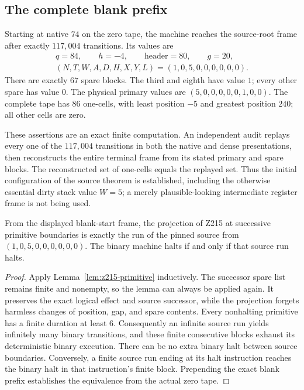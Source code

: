 \subsection{The complete blank prefix}

Starting at native $74$ on the zero tape, the machine reaches the source-root
frame after exactly $117{,}004$ transitions.  Its values are
\[
 \begin{gathered}
 q=84,\qquad h=-4,\qquad \text{header}=80,\qquad g=20,\\
 (N,T,W,A,D,H,X,Y,L)=(1,0,5,0,0,0,0,0,0).
 \end{gathered}
\]
There are exactly $67$ spare blocks.  The third and eighth have value $1$;
every other spare has value $0$.  The physical primary values are
$(5,0,0,0,0,0,1,0,0)$.  The complete tape has $86$ one-cells, with least
position $-5$ and greatest position $240$; all other cells are zero.

These assertions are an exact finite computation.  An independent audit
replays every one of the $117{,}004$ transitions in both the native and dense
presentations, then reconstructs the entire terminal frame from its stated
primary and spare blocks.  The reconstructed set of one-cells equals the
replayed set.  Thus the initial configuration of the source theorem is
established, including the otherwise essential dirty stack value $W=5$;
a merely plausible-looking intermediate register frame is not being used.

\begin{theorem}
\label{thm:z215-lift}
From the displayed blank-start frame, the projection of Z215 at successive
primitive boundaries is exactly the run of the pinned source from
$(1,0,5,0,0,0,0,0,0)$.  The binary machine halts if and only if that source
run halts.
\end{theorem}

\begin{proof}
Apply Lemma~\ref{lem:z215-primitive} inductively.  The successor spare list
remains finite and nonempty, so the lemma can always be applied again.  It
preserves the exact logical effect and source successor, while the projection
forgets harmless changes of position, gap, and spare contents.  Every
nonhalting primitive has a finite duration at least $6$.  Consequently an
infinite source run yields infinitely many binary transitions, and these
finite consecutive blocks exhaust its deterministic binary execution.
There can be no extra binary halt between source boundaries.  Conversely,
a finite source run ending at its halt instruction reaches the binary halt
in that instruction's finite block.  Prepending the exact blank prefix
establishes the equivalence from the actual zero tape.
\end{proof}


